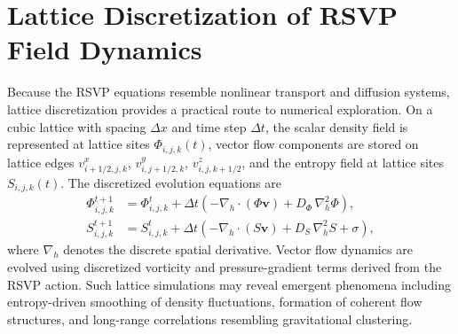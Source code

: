 \documentclass[12pt,a4paper]{article}
\theoremstyle{plain}
\theoremstyle{definition}
\theoremstyle{remark}
\begin{document}
\section{Lattice Discretization of RSVP Field Dynamics}

Because the RSVP equations resemble nonlinear transport and diffusion
systems, lattice discretization provides a practical route to numerical
exploration. On a cubic lattice with spacing $\Delta x$ and time step
$\Delta t$, the scalar density field is represented at lattice sites
$\Phi_{i,j,k}(t)$, vector flow components are stored on lattice edges
$v^x_{i+1/2,j,k}$, $v^y_{i,j+1/2,k}$, $v^z_{i,j,k+1/2}$, and the
entropy field at lattice sites $S_{i,j,k}(t)$. The discretized
evolution equations are
\begin{align}
\Phi_{i,j,k}^{t+1} &= \Phi_{i,j,k}^t
+ \Delta t\left(-\nabla_h\cdot(\Phi\mathbf{v})
+ D_\Phi\,\nabla_h^2\Phi\right), \\
S_{i,j,k}^{t+1} &= S_{i,j,k}^t
+ \Delta t\left(-\nabla_h\cdot(S\mathbf{v})
+ D_S\,\nabla_h^2 S + \sigma\right),
\end{align}
where $\nabla_h$ denotes the discrete spatial derivative.
Vector flow dynamics are evolved using discretized vorticity and
pressure-gradient terms derived from the RSVP action. Such lattice
simulations may reveal emergent phenomena including entropy-driven
smoothing of density fluctuations, formation of coherent flow
structures, and long-range correlations resembling gravitational
clustering.
\end{document}
